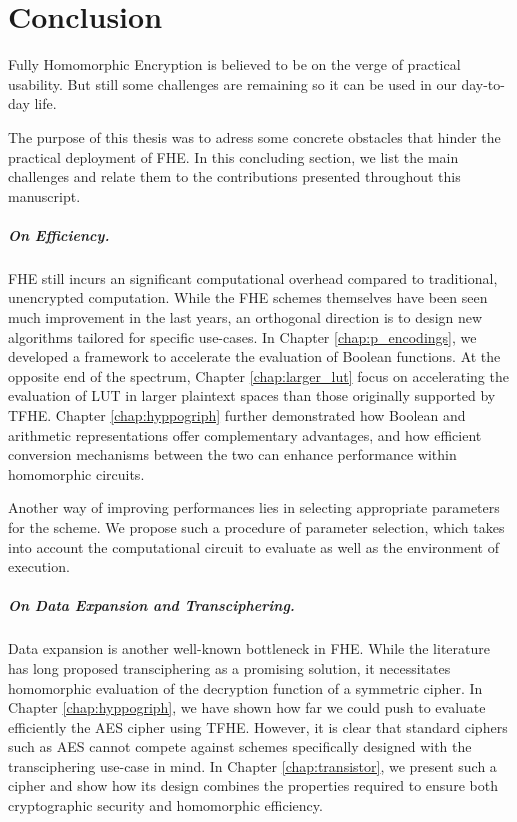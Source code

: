 \chapter*{Conclusion}


Fully Homomorphic Encryption is believed to be on the verge of practical usability. But still some challenges are remaining so it can be used in our day-to-day life.

The purpose of this thesis was to adress some concrete obstacles that hinder the practical deployment of \gls{FHE}. In this concluding section, we list the main challenges and relate them to the contributions presented throughout this manuscript.

\paragraph{On Efficiency.}

\gls{FHE} still incurs an significant computational overhead compared to traditional, unencrypted computation. While the \gls{FHE} schemes themselves have been seen much improvement in the last years, an orthogonal direction is to design new algorithms tailored for specific use-cases. In Chapter \ref{chap:p_encodings}, we developed a framework to accelerate the evaluation of Boolean functions. At the opposite end of the spectrum, Chapter \ref{chap:larger_lut} focus on accelerating the evaluation of \gls{LUT} in larger plaintext spaces than those originally supported by \gls{TFHE}. Chapter \ref{chap:hyppogriph} further demonstrated how Boolean and arithmetic representations offer complementary advantages, and how efficient conversion mechanisms  between the two can enhance performance within homomorphic circuits. 

Another way of improving performances lies in selecting appropriate parameters for the scheme. We propose such a procedure of parameter selection, which takes into account the computational circuit to evaluate as well as the environment of execution.




\paragraph{On Data Expansion and Transciphering.}


Data expansion is another well-known bottleneck in \gls{FHE}. While the literature has long proposed transciphering as a promising solution, it necessitates homomorphic evaluation of the decryption function of a symmetric cipher. In Chapter \ref{chap:hyppogriph}, we have shown how far we could push to evaluate efficiently the \gls{AES} cipher using \gls{TFHE}. However, it is clear that standard ciphers such as \gls{AES} cannot compete against schemes specifically designed with the transciphering use-case in mind. In Chapter \ref{chap:transistor}, we present such a cipher and show how its design combines the properties required to ensure both cryptographic security and homomorphic efficiency. 




